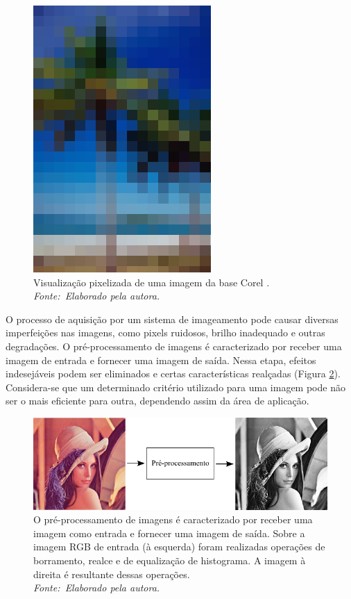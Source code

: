 \begin{figure}[!htbp]
 \begin{center}
   \includegraphics[width=0.4\linewidth]{figuras/pixel.jpg}
 \caption[Visualização pixelizada de uma imagem da base Corel.]{Visualização pixelizada de uma imagem da base Corel \cite{Wang2001}. \\ \textit{Fonte:~Elaborado pela autora.}}
 \label{fig:pixel}
 \end{center}
\end{figure}

O processo de aquisição por um sistema de imageamento pode causar diversas imperfeições nas imagens, como pixels ruidosos, brilho inadequado e outras degradações. O pré-processamento de imagens é caracterizado por receber uma imagem de entrada e fornecer uma imagem de saída. Nessa etapa, efeitos indesejáveis podem ser eliminados e certas características realçadas (Figura \ref{fig:preproc}). Considera-se que um determinado critério utilizado para uma imagem pode não ser o mais eficiente para outra, dependendo assim da área de aplicação.

\vspace{12pt}
\begin{figure}[!htbp]
 \begin{center}
   \includegraphics[width=1\linewidth]{figuras/preprocessamento.png}
 \caption[Sobre a imagem RGB de entrada foram realizadas operações de borramento, realce e de equalização de histograma. A imagem à direita é resultante dessas operações.]{O pré-processamento de imagens é caracterizado por receber uma imagem como entrada e fornecer uma imagem de saída. Sobre a imagem RGB de entrada (à esquerda) foram realizadas operações de borramento, realce e de equalização de histograma. A imagem à direita é resultante dessas operações. \\ \textit{Fonte:~Elaborado pela autora.}}
 \label{fig:preproc}
 \end{center}
\end{figure}


